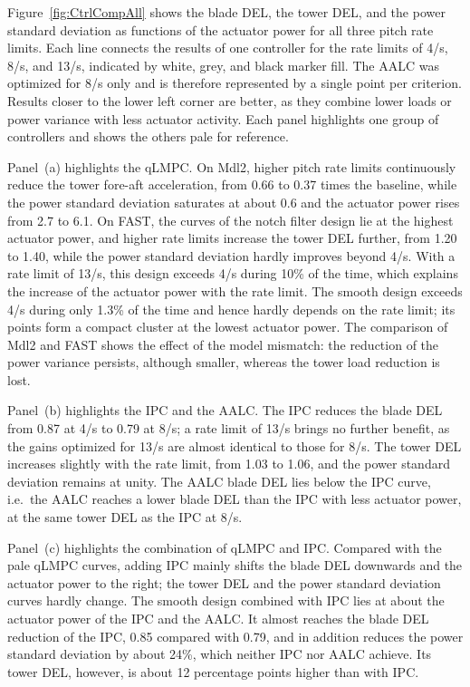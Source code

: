 Figure~\ref{fig:CtrlCompAll} shows the blade DEL, the tower DEL, and the power standard deviation
as functions of the actuator power for all three pitch rate limits. Each line connects the
results of one controller for the rate limits of 4\textdegree/s, 8\textdegree/s, and 13\textdegree/s,
indicated by white, grey, and black marker fill. The AALC was optimized for 8\textdegree/s only and
is therefore represented by a single point per criterion. Results closer to the lower left corner
are better, as they combine lower loads or power variance with less actuator activity. Each panel
highlights one group of controllers and shows the others pale for reference.

Panel~(a) highlights the qLMPC. On Mdl2, higher pitch rate limits continuously reduce the tower
fore-aft acceleration, from 0.66 to 0.37 times the baseline, while the power standard deviation
saturates at about 0.6 and the actuator power rises from 2.7 to 6.1. On FAST, the curves of the
notch filter design lie at the highest actuator power, and higher rate limits increase the tower
DEL further, from 1.20 to 1.40, while the power standard deviation hardly improves beyond
4\textdegree/s. With a rate limit of 13\textdegree/s, this design exceeds 4\textdegree/s during 10\%
of the time, which explains the increase of the actuator power with the rate limit. The smooth
design exceeds 4\textdegree/s during only 1.3\% of the time and hence hardly depends on the rate
limit; its points form a compact cluster at the lowest actuator power. The comparison of Mdl2 and FAST shows the effect
of the model mismatch: the reduction of the power variance persists, although smaller, whereas the
tower load reduction is lost.

Panel~(b) highlights the IPC and the AALC. The IPC reduces the blade DEL from 0.87 at
4\textdegree/s to 0.79 at 8\textdegree/s; a rate limit of 13\textdegree/s brings no further benefit,
as the gains optimized for 13\textdegree/s are almost identical to those for 8\textdegree/s. The tower
DEL increases slightly with the rate limit, from 1.03 to 1.06, and the power standard deviation
remains at unity. The AALC blade DEL lies below the IPC curve, i.e.\ the AALC reaches a lower blade
DEL than the IPC with less actuator power, at the same tower DEL as the IPC at 8\textdegree/s.

Panel~(c) highlights the combination of qLMPC and IPC. Compared with the pale qLMPC curves, adding
IPC mainly shifts the blade DEL downwards and the actuator power to the right; the tower DEL and
the power standard deviation curves hardly change. The smooth design combined with IPC lies at
about the actuator power of the IPC and the AALC. It almost reaches the blade DEL reduction of the
IPC, 0.85 compared with 0.79, and in addition reduces the power standard deviation by about 24\%,
which neither IPC nor AALC achieve. Its tower DEL, however, is about 12 percentage points higher
than with IPC.

